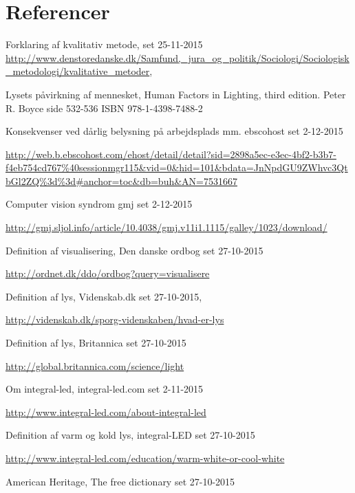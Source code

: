 \section{Referencer}

\begin{thebibliography}{99}


  Forklaring af kvalitativ metode,
  set 25-11-2015
  \url{http://www.denstoredanske.dk/Samfund,_jura_og_politik/Sociologi/Sociologisk_metodologi/kvalitative_metoder},

  Lysets påvirkning af mennesket,
  Human Factors in Lighting, third edition.
  Peter R. Boyce
  side 532-536
  ISBN 978-1-4398-7488-2

  Konsekvenser ved dårlig belysning på arbejdsplads mm.
  ebscohost
  set 2-12-2015
  
  \url{http://web.b.ebscohost.com/ehost/detail/detail?sid=2898a5ec-e3ec-4bf2-b3b7-f4eb754cd767%40sessionmgr115&vid=0&hid=101&bdata=JnNpdGU9ZWhvc3QtbGl2ZQ%3d%3d#anchor=toc&db=buh&AN=7531667}
  
  Computer vision syndrom
  gmj
  set 2-12-2015
  
  \url{http://gmj.sljol.info/article/10.4038/gmj.v11i1.1115/galley/1023/download/}
  


  Definition af visualisering,
  Den danske ordbog
  set 27-10-2015
  
  \url{http://ordnet.dk/ddo/ordbog?query=visualisere}
  
  Definition af lys,
  Videnskab.dk
  set 27-10-2015,
  
  \url{http://videnskab.dk/sporg-videnskaben/hvad-er-lys}
  
  Definition af lys,
  Britannica
  set 27-10-2015
  
  \url{http://global.britannica.com/science/light}

  Om integral-led,
  integral-led.com
  set 2-11-2015
  
  \url{http://www.integral-led.com/about-integral-led}
  
  Definition af varm og kold lys,
  integral-LED
  set 27-10-2015
  
  \url{http://www.integral-led.com/education/warm-white-or-cool-white}

  American Heritage,
  The free dictionary
  set 27-10-2015
  

\end{thebibliography}
